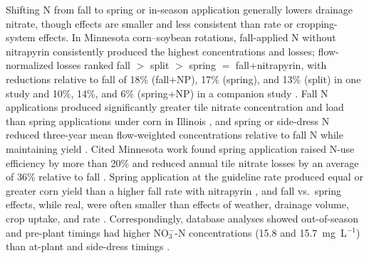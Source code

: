 \documentclass[11pt]{article}
\begin{document}
Shifting N from fall to spring or in-season application generally lowers drainage nitrate, though effects are smaller and less consistent than rate or cropping-system effects. In Minnesota corn--soybean rotations, fall-applied N without nitrapyrin consistently produced the highest concentrations and losses; flow-normalized losses ranked fall $>$ split $>$ spring $=$ fall+nitrapyrin, with reductions relative to fall of 18\% (fall+NP), 17\% (spring), and 13\% (split) in one study \parencite{Randall2003} and 10\%, 14\%, and 6\% (spring+NP) in a companion study \parencite{Randall2005}. Fall N applications produced significantly greater tile nitrate concentration and load than spring applications under corn in Illinois \parencite{Gentry2024}, and spring or side-dress N reduced three-year mean flow-weighted concentrations relative to fall N while maintaining yield \parencite{Pittelkow2017}. Cited Minnesota work found spring application raised N-use efficiency by more than 20\% and reduced annual tile nitrate losses by an average of 36\% relative to fall \parencite{Dinnes2002}. Spring application at the guideline rate produced equal or greater corn yield than a higher fall rate with nitrapyrin \parencite{Vetsch2019}, and fall vs.\ spring effects, while real, were often smaller than effects of weather, drainage volume, crop uptake, and rate \parencite{Liu2021}. Correspondingly, database analyses showed out-of-season and pre-plant timings had higher NO$_3^-$-N concentrations (15.8 and 15.7~mg~L$^{-1}$) than at-plant and side-dress timings \parencite{Hertzberger2019}.
\end{document}
